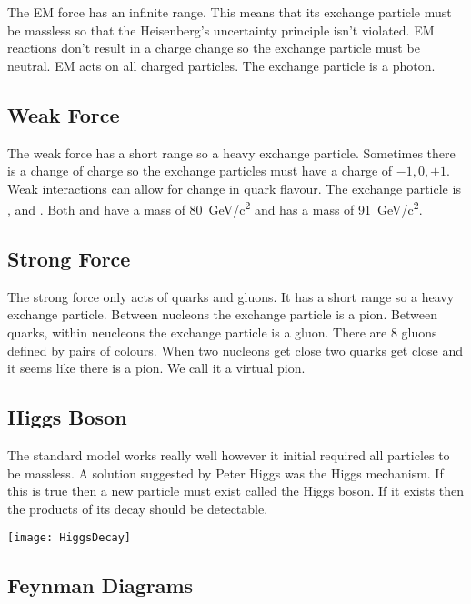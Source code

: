 The EM force has an infinite range. This means that its exchange particle must be massless so that the Heisenberg's uncertainty principle isn't violated. EM reactions don't result in a charge change so the exchange particle must be neutral. EM acts on all charged particles. The exchange particle is a photon.

\subsection*{Weak Force}

The weak force has a short range so a heavy exchange particle. Sometimes there is a change of charge so the exchange particles must have a charge of \(-1,0,+1\). Weak interactions can allow for change in quark flavour. The exchange particle is \wplus, \zboson and \wminus. Both \wplus and \wminus have a mass of \SI{80}{GeV/c^2} and \zboson has a mass of \SI{91}{GeV/c^2}.

\subsection*{Strong Force}

The strong force only acts of quarks and gluons. It has a short range so a heavy exchange particle. Between nucleons the exchange particle is a pion. Between quarks, within neucleons the exchange particle is a gluon. There are 8 gluons defined by pairs of colours. When two nucleons get close two quarks get close and it seems like there is a pion. We call it a virtual pion.

\subsection*{Higgs Boson}

The standard model works really well however it initial required all particles to be massless. A solution suggested by Peter Higgs was the Higgs mechanism. If this is true then a new particle must exist called the Higgs boson. If it exists then the products of its decay should be detectable.

\begin{center}
\texttt{[image: HiggsDecay]}
\end{center}

\subsection*{Feynman Diagrams}

